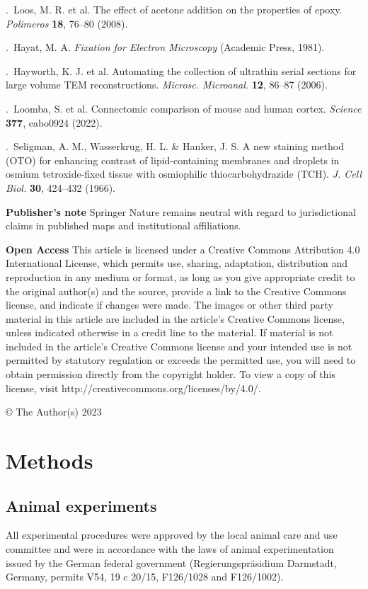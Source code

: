 \documentclass{article}
\begin{document}
.\ Loos, M. R. et al. The effect of acetone addition on the properties of epoxy. \emph{Polimeros} \textbf{18}, 76–80 (2008).\par
{}.\ Hayat, M. A. \emph{Fixation for Electron Microscopy} (Academic Press, 1981).\par
{}.\ Hayworth, K. J. et al. Automating the collection of ultrathin serial sections for large volume TEM reconstructions. \emph{Microsc. Microanal.} \textbf{12}, 86–87 (2006).\par
{}.\ Loomba, S. et al. Connectomic comparison of mouse and human cortex. \emph{Science} \textbf{377}, eabo0924 (2022).\par
{}.\ Seligman, A. M., Wasserkrug, H. L. \& Hanker, J. S. A new staining method (OTO) for enhancing contrast of lipid-containing membranes and droplets in osmium tetroxide-fixed tissue with osmiophilic thiocarbohydrazide (TCH). \emph{J. Cell Biol.} \textbf{30}, 424–432 (1966).\par

\noindent\textbf{Publisher’s note} Springer Nature remains neutral with regard to jurisdictional claims in published maps and institutional affiliations.

\noindent\textbf{Open Access} This article is licensed under a Creative Commons Attribution 4.0 International License, which permits use, sharing, adaptation, distribution and reproduction in any medium or format, as long as you give appropriate credit to the original author(s) and the source, provide a link to the Creative Commons license, and indicate if changes were made. The images or other third party material in this article are included in the article’s Creative Commons license, unless indicated otherwise in a credit line to the material. If material is not included in the article’s Creative Commons license and your intended use is not permitted by statutory regulation or exceeds the permitted use, you will need to obtain permission directly from the copyright holder. To view a copy of this license, visit http://creativecommons.org/licenses/by/4.0/.

\noindent © The Author(s) 2023 

\section*{Methods}

\subsection*{Animal experiments}
All experimental procedures were approved by the local animal care and use committee and were in accordance with the laws of animal experimentation issued by the German federal government (Regierungspräsidium Darmstadt, Germany, permits V54, 19 c 20/15, F126/1028 and F126/1002).
\end{document}
